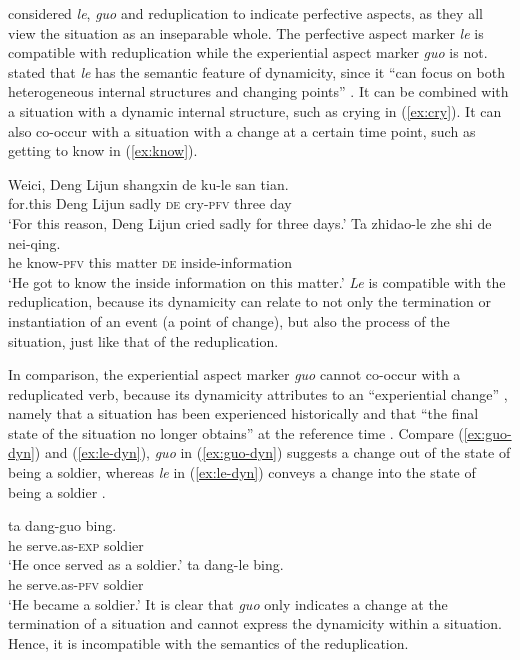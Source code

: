 \citet[Ch. 4]{XiaoMcEnery2004} considered \textit{le}, \textit{guo} and reduplication to indicate perfective aspects, as they all view the situation as an inseparable whole.
The perfective aspect marker \textit{le} is compatible with reduplication while the experiential aspect marker \textit{guo} is not.
\citet[128--131]{XiaoMcEnery2004} stated that \textit{le} has the semantic feature of dynamicity, since it ``can focus on both heterogeneous internal structures and changing points'' \citep[129]{XiaoMcEnery2004}.
It can be combined with a situation with a dynamic internal structure, such as crying in (\ref{ex:cry}).
It can also co\hyp{}occur with a situation with a change at a certain time point, such as getting to know in (\ref{ex:know}).

\settowidth{}

\ea
  \ea\label{ex:cry}
    \gll Weici, Deng Lijun shangxin de ku-le san tian.\\
    for.this Deng Lijun sadly \textsc{de} cry-\textsc{pfv} three day\\ 
    \glt `For this reason, Deng Lijun cried sadly for three days.'
  \ex\label{ex:know}
    \gll Ta zhidao-le zhe shi de nei-qing.\\
    he know-\textsc{pfv} this matter \textsc{de} inside-information\\ 
    \glt `He got to know the inside information on this matter.'
  \z
\z
\textit{Le} is compatible with the reduplication, because its dynamicity can relate to not only the termination or instantiation of an event (a point of change), but also the process of the situation, just like that of the reduplication.

In comparison, the experiential aspect marker \textit{guo} cannot co\hyp{}occur with a reduplicated verb, 
because its dynamicity attributes to an ``experiential change'' \citep[148]{XiaoMcEnery2004}, 
namely that a situation has been experienced historically and that ``the final state of the situation no longer obtains'' at the reference time \citep[144]{XiaoMcEnery2004}. 
Compare (\ref{ex:guo-dyn}) and (\ref{ex:le-dyn}), \textit{guo} in (\ref{ex:guo-dyn}) suggests a change out of the state of being a soldier, 
whereas \textit{le} in (\ref{ex:le-dyn}) conveys a change into the state of being a soldier \citep[149]{XiaoMcEnery2004}.

\ea
  \ea\label{ex:guo-dyn}
    \gll ta dang-guo bing.\\
    he serve.as-\textsc{exp} soldier\\ 
    \glt `He once served as a soldier.'
  \ex\label{ex:le-dyn}
    \gll ta dang-le bing.\\
    he serve.as-\textsc{pfv} soldier\\ 
    \glt `He became a soldier.'
  \z
\z
It is clear that \textit{guo} only indicates a change at the termination of a situation and cannot express the dynamicity within a situation.
Hence, it is incompatible with the semantics of the reduplication.


